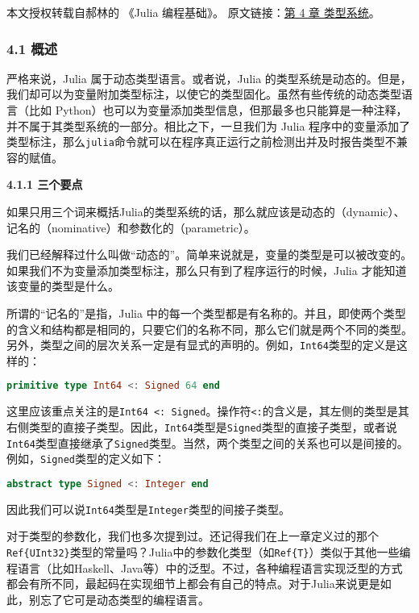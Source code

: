
本文授权转载自郝林的 《Julia 编程基础》。 原文链接：\href{https://github.com/hyper0x/JuliaBasics/blob/master/book/ch04.md}{第 4 章 类型系统}。


\subsubsection{4.1 概述}

严格来说，Julia 属于动态类型语言。或者说，Julia 的类型系统是动态的。但是，我们却可以为变量附加类型标注，以使它的类型固化。虽然有些传统的动态类型语言（比如 Python）也可以为变量添加类型信息，但那最多也只能算是一种注释，并不属于其类型系统的一部分。相比之下，一旦我们为 Julia 程序中的变量添加了类型标注，那么\verb|julia|命令就可以在程序真正运行之前检测出并及时报告类型不兼容的赋值。

\textbf{4.1.1 三个要点}

如果只用三个词来概括Julia的类型系统的话，那么就应该是动态的（dynamic）、记名的（nominative）和参数化的（parametric）。

我们已经解释过什么叫做“动态的”。简单来说就是，变量的类型是可以被改变的。如果我们不为变量添加类型标注，那么只有到了程序运行的时候，Julia 才能知道该变量的类型是什么。

所谓的“记名的”是指，Julia 中的每一个类型都是有名称的。并且，即使两个类型的含义和结构都是相同的，只要它们的名称不同，那么它们就是两个不同的类型。另外，类型之间的层次关系一定是有显式的声明的。例如，\verb|Int64|类型的定义是这样的：

\begin{lstlisting}[language=julia]
primitive type Int64 <: Signed 64 end
\end{lstlisting}

这里应该重点关注的是\verb|Int64 <: Signed|。操作符\verb|<:|的含义是，其左侧的类型是其右侧类型的直接子类型。因此，\verb|Int64|类型是\verb|Signed|类型的直接子类型，或者说\verb|Int64|类型直接继承了\verb|Signed|类型。当然，两个类型之间的关系也可以是间接的。例如，\verb|Signed|类型的定义如下：

\begin{lstlisting}[language=julia]
abstract type Signed <: Integer end
\end{lstlisting}

因此我们可以说\verb|Int64|类型是\verb|Integer|类型的间接子类型。

对于类型的参数化，我们也多次提到过。还记得我们在上一章定义过的那个\verb|Ref{UInt32}|类型的常量吗？Julia中的参数化类型（如\verb|Ref{T}|）类似于其他一些编程语言（比如Haskell、Java等）中的泛型。不过，各种编程语言实现泛型的方式都会有所不同，最起码在实现细节上都会有自己的特点。对于Julia来说更是如此，别忘了它可是动态类型的编程语言。

